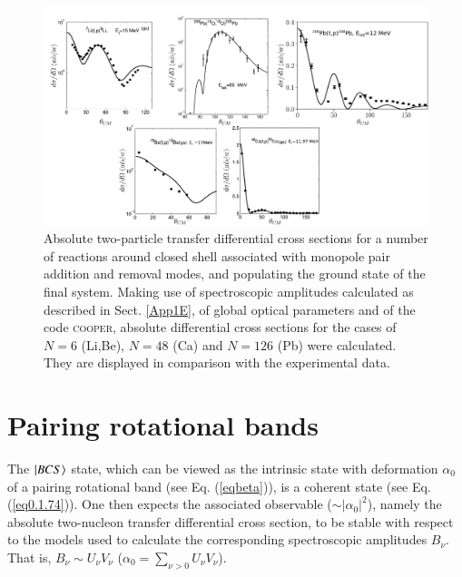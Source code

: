  \begin{figure}
 	\centerline{\includegraphics*[width=18cm,angle=0]{C8/figsC8/fig8_1_5}}
 	\caption{Absolute two-particle transfer differential cross sections for a number of reactions around closed shell associated with monopole pair addition and removal modes, and populating the ground state of the final system. Making use of spectroscopic amplitudes calculated  as described in Sect. \ref{App1E},  of global optical parameters and of the code \textsc{cooper},  absolute differential cross sections for the cases of $N=6$ (Li,Be), $N=48$ (Ca) and  $N=126$ (Pb)  were calculated. They are displayed in comparison with the experimental data.   
 	 }\label{fig8_2_1}
 \end{figure}
 


   

\section[Pairing rotational bands]{Pairing rotational bands}\label{C8S2}
The $|{BCS} \rangle$ state, which can be viewed as the intrinsic state with deformation $\alpha_0$ of a pairing rotational band (see Eq. (\ref{eqbeta})), is a coherent state (see Eq. (\ref{eq0.1.74})). One then expects the associated observable ($\sim|\alpha_0|^2$), namely the absolute two-nucleon transfer differential cross section, to be stable with respect to the models used to calculate the corresponding spectroscopic amplitudes $B_\nu$. That is, $B_\nu\sim U_\nu V_\nu$  ($\alpha_0=\sum_{\nu>0}U_\nu V_\nu$). 


